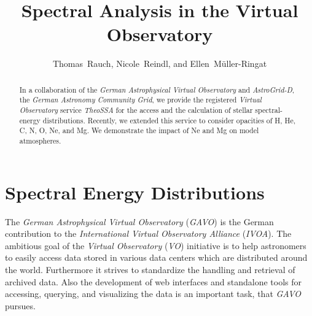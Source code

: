 
\resetcounters




\title{Spectral Analysis in the Virtual Observatory}
\author{Thomas~Rauch, Nicole~Reindl, and Ellen~M\"uller-Ringat
}


\begin{abstract}
In a collaboration of the \emph{German Astrophysical Virtual Observatory}
and \emph{AstroGrid-D}, the \emph{German Astronomy Community Grid},
we provide the registered \emph{Virtual Observatory} service \emph{TheoSSA} for the access and the 
calculation of stellar spectral-energy distributions.
Recently, we extended this service to consider opacities of H, He, C, N, O, 
Ne, and Mg. We demonstrate the impact of Ne and Mg on model atmospheres. 
\end{abstract}


\section{Spectral Energy Distributions }
\label{sect:seds}

The \emph{German Astrophysical Virtual Observatory} (\emph{GAVO}) is the German contribution to the 
\emph{International Virtual Observatory Alliance} (\emph{IVOA}). The ambitious goal of the \emph{Virtual 
Observatory} (\emph{VO}) initiative is to help astronomers to easily access data stored in various 
data centers which are distributed around the world. Furthermore it strives to 
standardize the handling and retrieval of archived data. Also the development of web 
interfaces and standalone tools for accessing, querying, and visualizing the
data is an important task, that \emph{GAVO} pursues.


